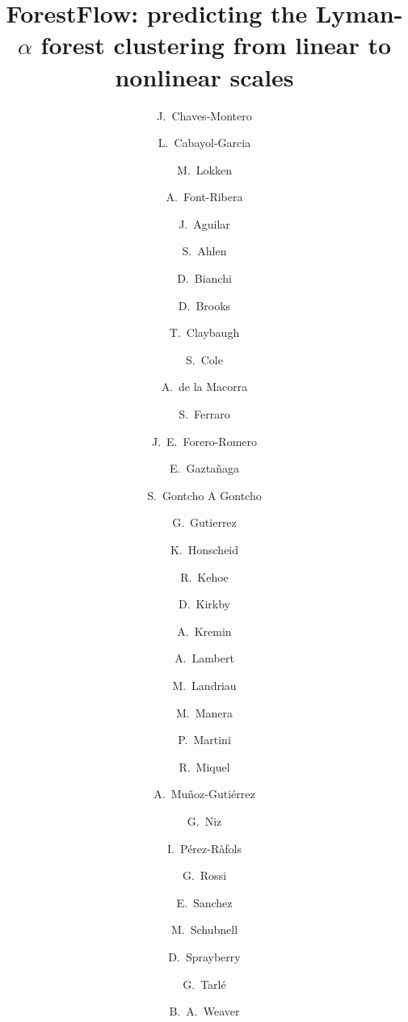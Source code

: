 \documentclass[longauth]{aa}
\begin{document}
\title{ForestFlow: predicting the Lyman-$\alpha$ forest clustering from linear to nonlinear scales}

\author{
J.~Chaves-Montero\inst{\ref{inst0}}
\and
L.~Cabayol-Garcia\inst{\ref{inst0},\ref{inst1}}
\and
M.~Lokken\inst{\ref{inst0}}
\and
A.~Font-Ribera\inst{\ref{inst0}}
\and
J.~Aguilar\inst{\ref{inst2}}
\and
S.~Ahlen\inst{\ref{inst3}}
\and
D.~Bianchi\inst{\ref{inst19}}
\and
D.~Brooks\inst{\ref{inst23}}
\and
T.~Claybaugh\inst{\ref{inst2}}
\and
S.~Cole\inst{\ref{inst6}}
\and
A.~de la Macorra\inst{\ref{inst37}}
\and
S.~Ferraro\inst{\ref{inst2},\ref{inst43}}
\and
J.~E.~Forero-Romero\inst{\ref{inst52},\ref{inst53}}
\and
E.~Gaztañaga\inst{\ref{inst55},\ref{inst27}}
\and
S.~Gontcho A Gontcho\inst{\ref{inst2}}
\and
G.~Gutierrez\inst{\ref{inst25}}
\and
K.~Honscheid\inst{\ref{inst33},\ref{inst46},\ref{inst47}}
\and
R.~Kehoe\inst{\ref{inst66}}
\and
D.~Kirkby\inst{\ref{inst14}}
\and
A.~Kremin\inst{\ref{inst2}}
\and
A.~Lambert\inst{\ref{inst2}}
\and
M.~Landriau\inst{\ref{inst2}}
\and
M.~Manera\inst{\ref{inst75},\ref{inst0}}
\and
P.~Martini\inst{\ref{inst33},\ref{inst65},\ref{inst47}}
\and
R.~Miquel\inst{\ref{inst77},\ref{inst0}}
\and
A.~Muñoz-Gutiérrez\inst{\ref{inst37}}
\and
G.~Niz\inst{\ref{inst36},\ref{inst11}}
\and
I.~P\'erez-R\`afols\inst{\ref{inst84}}
\and
G.~Rossi\inst{\ref{inst88}}
\and
E.~Sanchez\inst{\ref{inst38}}
\and
M.~Schubnell\inst{\ref{inst7}}
\and
D.~Sprayberry\inst{\ref{inst21}}
\and
G.~Tarl\'{e}\inst{\ref{inst7}}
\and
B.~A.~Weaver\inst{\ref{inst21}}
}
\end{document}
